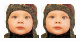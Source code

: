 \documentclass[runningheads]{llncs}
\begin{document}
\def\mywidth{0.17\textwidth}
\begin{figure}[t]
  \centering
  \includegraphics[width=\mywidth]{set5_1_orig.png}
  \includegraphics[width=\mywidth]{set5_1_bicubic.png}

\end{figure}
\end{document}
